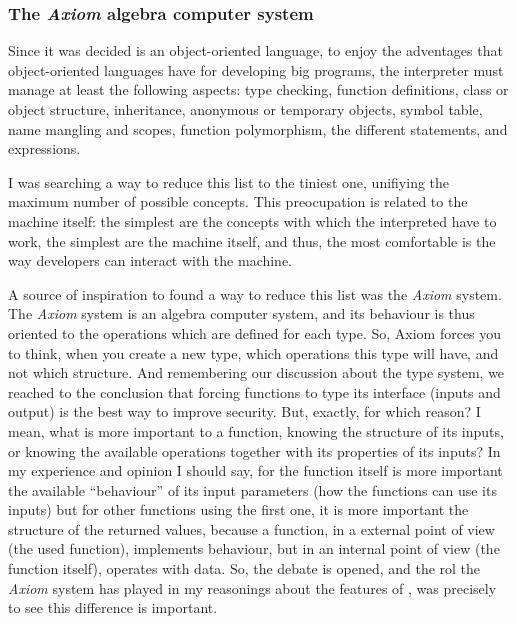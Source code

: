 \documentclass{article}
\begin{document}
\subsubsection{The \textit{Axiom} algebra computer system}
Since it was decided \faupp is an object-oriented language, to enjoy the
adventages that object-oriented languages have for developing big programs, the
interpreter must manage at least the following aspects: type checking,
function definitions, class or object structure, inheritance, anonymous or
temporary objects, symbol table, name mangling and scopes, function
polymorphism, the different statements, and expressions.

I was searching a way to reduce this list to the tiniest one, unifiying the
maximum number of possible concepts. This preocupation is related to the machine
itself: the simplest are the concepts with which the interpreted have to work,
the simplest are the machine itself, and thus, the most comfortable is the way
developers can interact with the machine.

A source of inspiration to found a way to reduce this list was the
\textit{Axiom} system. The \textit{Axiom} system is an algebra computer system,
and its behaviour is thus oriented to the operations which are defined for each
type. So, Axiom forces you to think, when you create a new type, which
operations this type will have, and not which structure. And remembering our
discussion about the type system, we reached to the conclusion that forcing
functions to type its interface (inputs and output) is the best way to improve
security. But, exactly, for which reason? I mean, what is more important to a
function, knowing the structure of its inputs, or knowing the available
operations together with its properties of its inputs? In my experience and
opinion I should say, for the function itself is more important the available
``behaviour'' of its input parameters (how the functions can use its inputs) but
for other functions using the first one, it is more important the structure of
the returned values, because a function, in a external point of view (the used
function), implements behaviour, but in an internal point of view (the function
itself), operates with data. So, the debate is opened, and the rol the
\textit{Axiom} system has played in my reasonings about the features of \faupp,
was precisely to see this difference is important.
\end{document}

